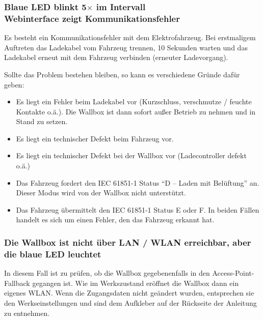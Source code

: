 \documentclass[a4paper,10pt]{article}
\begin{document}
\begin{multicols*}{2}
	\subsubsection*{Blaue LED blinkt 5$\times$ im Intervall \\ Webinterface zeigt Kommunikationsfehler}
	Es besteht ein Kommunikationsfehler mit dem Elektrofahrzeug. Bei erstmaligem
	Auftreten das Ladekabel vom Fahrzeug trennen, 10 Sekunden warten und das
	Ladekabel erneut mit dem Fahrzeug verbinden (erneuter Ladevorgang).

	Sollte das Problem bestehen bleiben, so kann es verschiedene Gründe dafür
	geben:
	\begin{itemize}
		\item Es liegt ein Fehler beim Ladekabel vor (Kurzschluss, verschmutze / feuchte
		      Kontakte o.ä.). Die Wallbox ist dann sofort außer Betrieb zu nehmen und
		      in Stand zu setzen.
		\item Es liegt ein technischer Defekt beim Fahrzeug vor.
		\item Es liegt ein technischer Defekt bei der Wallbox vor (Ladecontroller defekt o.ä.)
		\item Das Fahrzeug fordert den IEC 61851-1 Status \enquote{D – Laden mit Belüftung}
		      an. Dieser Modus wird von der Wallbox nicht unterstützt.
		\item Das Fahrzeug übermittelt den IEC 61851-1 Status E oder F. In beiden Fällen
		      handelt es sich um einen Fehler, den das Fahrzeug erkannt hat.
	\end{itemize}

	\subsubsection*{Die Wallbox ist nicht über LAN / WLAN erreichbar, aber die blaue LED leuchtet}
	In diesem Fall ist zu prüfen, ob die Wallbox gegebenenfalls in den Access-Point-Fallback
	gegangen ist. Wie im Werkszustand eröffnet die Wallbox dann ein eigenes
	WLAN. Wenn die Zugangsdaten nicht geändert wurden, entsprechen sie den Werkseinstellungen und sind dem
	Aufkleber auf der Rückseite der Anleitung zu entnehmen.



\end{multicols*}
\end{document}
